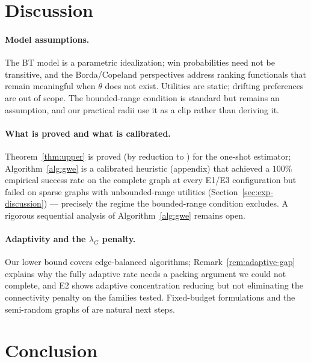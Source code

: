 \documentclass[11pt]{article}
\theoremstyle{definition}
\newcommand{\lG}{\lambda_G}
\begin{document}
\section{Discussion}
\label{sec:discussion}

\paragraph{Model assumptions.}  The BT model is a parametric idealization; win probabilities need not be transitive, and the Borda/Copeland perspectives \cite{shah2015simple,bengs2023identifying,wu2023borda} address ranking functionals that remain meaningful when $\theta$ does not exist.  Utilities are static; drifting preferences are out of scope.  The bounded-range condition is standard \cite{chen2017spectral,yang2026graphmonotone} but remains an assumption, and our practical radii use it as a clip rather than deriving it.

\paragraph{What is proved and what is calibrated.}  Theorem~\ref{thm:upper} is proved (by reduction to \cite{yang2026graphmonotone,li2021ellinftybounds}) for the one-shot estimator; Algorithm~\ref{alg:gwe} is a calibrated heuristic (appendix) that achieved a $100\%$ empirical success rate on the complete graph at every E1/E3 configuration but failed on sparse graphs with unbounded-range utilities (Section~\ref{sec:exp-discussion}) --- precisely the regime the bounded-range condition excludes.  A rigorous sequential analysis of Algorithm~\ref{alg:gwe} remains open.

\paragraph{Adaptivity and the $\lG$ penalty.}  Our lower bound covers edge-balanced algorithms; Remark~\ref{rem:adaptive-gap} explains why the fully adaptive rate needs a packing argument we could not complete, and E2 shows adaptive concentration reducing but not eliminating the connectivity penalty on the families tested.  Fixed-budget formulations \cite{goldberger2026optimal} and the semi-random graphs of \cite{yang2024topk} are natural next steps.

\section{Conclusion}
\label{sec:conclusion}
\end{document}
